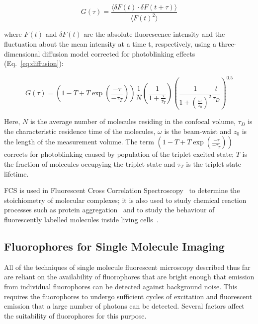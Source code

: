 \begin{equation}
G(\tau) = \frac{\langle \delta F(t) \cdot \delta F(t + \tau)\rangle}{\langle F(t)^2 \rangle}
\label{eq:fcs}
\end{equation}   

where  $F(t)$ and $\delta F(t)$ are the absolute fluorescence intensity and the fluctuation about the mean intensity at a time t, respectively, using a three-dimensional diffusion model corrected for photoblinking effects (Eq.~\ref{eq:diffusion}): 

\begin{equation}
G(\tau) = \left( 1 - T + T\exp(\frac{-\tau}{-\tau_T}) \right)\frac{1}{N}\left( \frac{1}{1 + \frac{\tau}{\tau_T}} \right)\left( \frac{1}{1 + (\frac{\omega}{z_0})^2}\frac{t}{\tau_D}\right)^{0.5}
\label{eq:diffusion}
\end{equation}   

Here, $N$ is the average number of molecules residing in the confocal volume, $\tau_D$ is the characteristic residence time of the molecules, $\omega$ is the beam-waist and $z_0$ is the length of the measurement volume. The term $\left( 1 - T + T\exp(\frac{-\tau}{-\tau_T}) \right)$ corrects for photoblinking caused by population of the triplet excited state; $T$ is the fraction of molecules occupying the triplet state and $\tau_T$ is the triplet state lifetime.

FCS is used in Fluorescent Cross Correlation Spectroscopy~\cite{Bacia2007} to determine the stoichiometry of molecular complexes; it is also used to study chemical reaction processes such as protein aggregation~\cite{Berland1996, Tjernberg1999} and to study the behaviour of fluorescently labelled molecules inside living cells~\cite{Bacia2006}. 

\subsection{Fluorophores for Single Molecule Imaging}
\label{sect:fluorophores}
All of the techniques of single molecule fluorescent microscopy described thus far are reliant on the availability of fluorophores that are bright enough that emission from individual fluorophores can be detected against background noise.  This requires the fluorophores to undergo sufficient cycles of excitation and fluorescent emission that a large number of photons can be detected. Several factors affect the suitability of fluorophores for this purpose.

